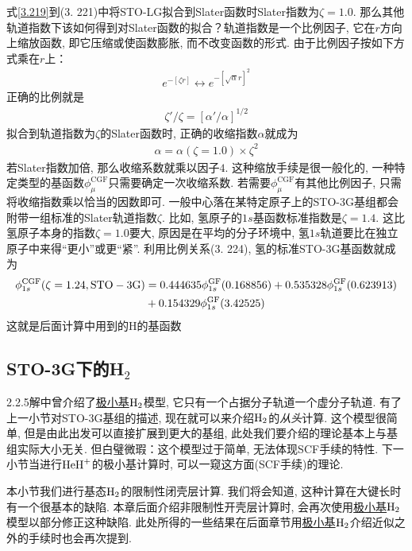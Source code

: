 式\eqref{3.219}到(3.
221)中将STO-LG拟合到Slater函数时Slater指数为$\zeta=1.0$. 
那么其他轨道指数下该如何得到对Slater函数的拟合？轨道指数是一个比例因子, 
它在$r$方向上缩放函数, 
即它压缩或使函数膨胀, 
而不改变函数的形式. 
由于比例因子按如下方式乘在$r$上：
\begin{align}
	e^{-[\zeta r]} \leftrightarrow e^{-[\sqrt{\alpha}r]^2}
\end{align}
正确的比例就是
\begin{align}
	\zeta'/\zeta=[\alpha'/\alpha]^{1/2}
\end{align}
拟合到轨道指数为$\zeta$的Slater函数时, 
正确的收缩指数$\alpha$就成为
\begin{align}
	\alpha = \alpha(\zeta=1.0)\times \zeta^2
\end{align}
若Slater指数加倍, 
那么收缩系数就乘以因子$4$. 
这种缩放手续是很一般化的, 
一种特定类型的基函数$\phi_\mu^\mathrm{CGF}$只需要确定一次收缩系数. 
若需要$\phi_\mu^\mathrm{CGF}$有其他比例因子, 
只需将收缩指数乘以恰当的因数即可. 
一般中心落在某特定原子上的STO-3G基组都会附带一组标准的Slater轨道指数$\zeta$. 
比如, 
氢原子的$1s$基函数标准指数是$\zeta=1.4$. 
这比氢原子本身的指数$\zeta=1.0$要大, 
原因是在平均的分子环境中, 
氢$1s$轨道要比在独立原子中来得``更小”或更``紧”. 
利用比例关系(3.
224), 
氢的标准STO-3G基函数就成为
\begin{align}
	\label{3.225}
	\phi_{1s}^\mathrm{CGF}(\zeta=1.24,\mathrm{STO-3G}) & = 0.444635\phi_{1s}^\mathrm{GF}(0.168856) + 0.535328\phi_{1s}^\mathrm{GF}(0.623913) \notag\\
	& + 0.154329\phi_{1s}^\mathrm{GF}(3.42525)
\end{align}
这就是后面计算中用到的$\mathrm{H}$的基函数
\subsection{STO-3G下的H$_2$}
2.2.5解中曾介绍了\underline{极小基$\mathrm{H}_2$}模型, 它只有一个占据分子轨道一个虚分子轨道. 
有了上一小节对STO-3G基组的描述, 现在就可以来介绍$\mathrm{H}_2$的\emph{从头}\hft 计算. 
这个模型很简单, 但是由此出发可以直接扩展到更大的基组, 此处我们要介绍的\hft 理论基本上与基组实际大小无关. 
但白璧微瑕：这个模型过于简单, 无法体现SCF手续的特性. 
下一小节当进行$\mathrm{HeH}^+$的极小基计算时, 可以一窥这方面(SCF手续)的\hft 理论.

本小节我们进行基态$\mathrm{H}_2$的限制性闭壳层计算. 
我们将会知道, 
这种计算在大键长时有一个很基本的缺陷. 
本章后面介绍非限制性开壳层计算时, 
会再次使用\underline{极小基$\mathrm{H}_2$}模型以部分修正这种缺陷. 
此处所得的一些结果在后面章节用\underline{极小基$\mathrm{H}_2$}介绍\hft 近似之外的手续时也会再次提到.


